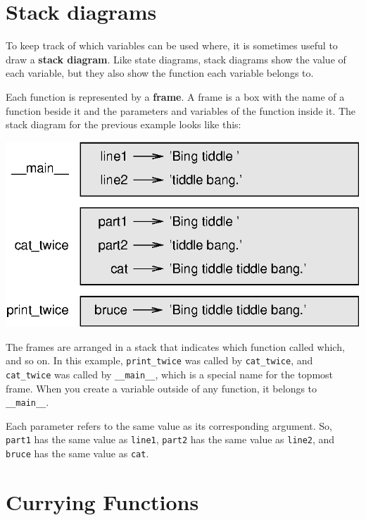 \documentclass[10pt]{book}
\begin{document}
\section{Stack diagrams}
\label{stackdiagram}
To keep track of which variables can be used where, it is sometimes 
useful to draw a {\bf stack diagram}.  Like state diagrams, stack 
diagrams show the value of each variable, but they also show the 
function each variable belongs to.


Each function is represented by a {\bf frame}.  A frame is a box
with the name of a function
beside it and the parameters and variables of the function inside it.
The stack diagram for the
previous example looks like this:

\beforefig
\centerline{\includegraphics{figs/stack.eps}}
\afterfig

The frames are arranged in a stack that indicates which function
called which, and so on.  In this example, \verb"print_twice"
was called by \verb"cat_twice", and \verb"cat_twice" was called by 
\verb"__main__", which is a special name for the topmost frame.  When
you create a variable outside of any function, it belongs to 
\verb"__main__".

Each parameter refers to the same value as its corresponding
argument.  So, {\tt part1} has the same value as
{\tt line1}, {\tt part2} has the same value as {\tt line2},
and {\tt bruce} has the same value as {\tt cat}.

\section{Currying Functions}

\end{document}
